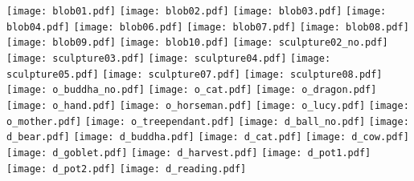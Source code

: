 \centering\texttt{[image: blob01.pdf]}
\centering\texttt{[image: blob02.pdf]}
\centering\texttt{[image: blob03.pdf]}
\centering\texttt{[image: blob04.pdf]}
\centering\texttt{[image: blob06.pdf]}
\centering\texttt{[image: blob07.pdf]}
\centering\texttt{[image: blob08.pdf]}
\centering\texttt{[image: blob09.pdf]}
\centering\texttt{[image: blob10.pdf]}
\centering\texttt{[image: sculpture02\_no.pdf]}
\centering\texttt{[image: sculpture03.pdf]}
\centering\texttt{[image: sculpture04.pdf]}
\centering\texttt{[image: sculpture05.pdf]}
\centering\texttt{[image: sculpture07.pdf]}
\centering\texttt{[image: sculpture08.pdf]}
\centering\texttt{[image: o\_buddha\_no.pdf]}
\centering\texttt{[image: o\_cat.pdf]}
\centering\texttt{[image: o\_dragon.pdf]}
\centering\texttt{[image: o\_hand.pdf]}
\centering\texttt{[image: o\_horseman.pdf]}
\centering\texttt{[image: o\_lucy.pdf]}
\centering\texttt{[image: o\_mother.pdf]}
\centering\texttt{[image: o\_treependant.pdf]}
\centering\texttt{[image: d\_ball\_no.pdf]}
\centering\texttt{[image: d\_bear.pdf]}
\centering\texttt{[image: d\_buddha.pdf]}
\centering\texttt{[image: d\_cat.pdf]}
\centering\texttt{[image: d\_cow.pdf]}
\centering\texttt{[image: d\_goblet.pdf]}
\centering\texttt{[image: d\_harvest.pdf]}
\centering\texttt{[image: d\_pot1.pdf]}
\centering\texttt{[image: d\_pot2.pdf]}
\centering\texttt{[image: d\_reading.pdf]}
